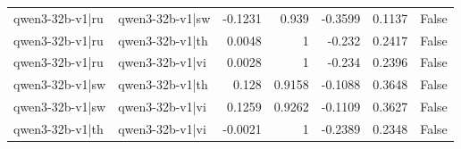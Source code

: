 \begin{table}
\begin{tabular}{l l r r r r l}
qwen3-32b-v1|ru & qwen3-32b-v1|sw & -0.1231 & 0.939 & -0.3599 & 0.1137 & False \\
qwen3-32b-v1|ru & qwen3-32b-v1|th & 0.0048 & 1 & -0.232 & 0.2417 & False \\
qwen3-32b-v1|ru & qwen3-32b-v1|vi & 0.0028 & 1 & -0.234 & 0.2396 & False \\
qwen3-32b-v1|sw & qwen3-32b-v1|th & 0.128 & 0.9158 & -0.1088 & 0.3648 & False \\
qwen3-32b-v1|sw & qwen3-32b-v1|vi & 0.1259 & 0.9262 & -0.1109 & 0.3627 & False \\
qwen3-32b-v1|th & qwen3-32b-v1|vi & -0.0021 & 1 & -0.2389 & 0.2348 & False \\
\bottomrule
\end{tabular}
\end{table}
